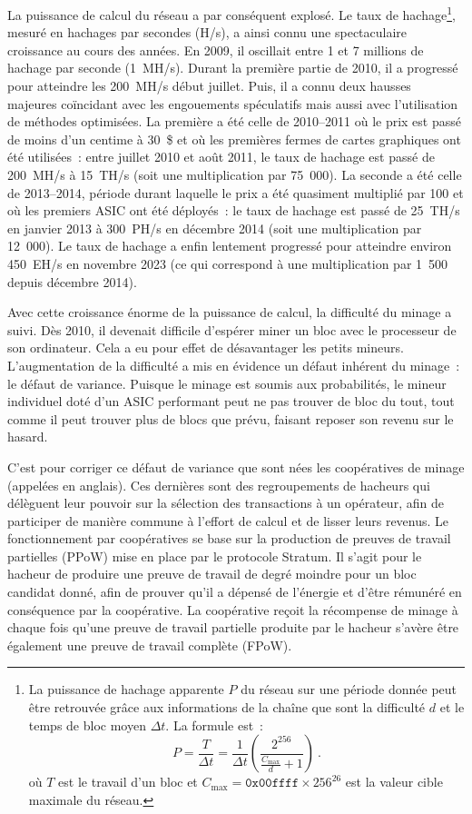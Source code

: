La puissance de calcul du réseau a par conséquent explosé. Le taux de hachage\footnote{La puissance de hachage apparente $P$ du réseau sur une période donnée peut être retrouvée grâce aux informations de la chaîne que sont la difficulté $d$ et le temps de bloc moyen $\Delta t$. La formule est~: \[
P = \frac{T}{\Delta t} = \frac{1}{\Delta t} \left( \frac{2^{256}}{\frac{C_{\mathrm{max}}}{d} + 1} \right)~.
\] où $T$ est le travail d'un bloc et $C_{\mathrm{max}} = \mathtt{0x00ffff} \times 256^{26}$ est la valeur cible maximale du réseau.}, mesuré en hachages par secondes (H/s), a ainsi connu une spectaculaire croissance au cours des années. En 2009, il oscillait entre 1 et 7 millions de hachage par seconde (1~MH/s). Durant la première partie de 2010, il a progressé pour atteindre les 200~MH/s début juillet. Puis, il a connu deux hausses majeures coïncidant avec les engouements spéculatifs mais aussi avec l'utilisation de méthodes optimisées. La première a été celle de 2010--2011 où le prix est passé de moins d'un centime à 30~\$ et où les premières fermes de cartes graphiques ont été utilisées~: entre juillet 2010 et août 2011, le taux de hachage est passé de 200~MH/s à 15~TH/s (soit une multiplication par 75~000). La seconde a été celle de 2013--2014, période durant laquelle le prix a été quasiment multiplié par 100 et où les premiers ASIC ont été déployés~: le taux de hachage est passé de 25~TH/s en janvier 2013 à 300~PH/s en décembre 2014 (soit une multiplication par 12~000). Le taux de hachage a enfin lentement progressé pour atteindre environ 450~EH/s en novembre 2023 (ce qui correspond à une multiplication par 1~500 depuis décembre 2014).


Avec cette croissance énorme de la puissance de calcul, la difficulté du minage a suivi. Dès 2010, il devenait difficile d'espérer miner un bloc avec le processeur de son ordinateur. Cela a eu pour effet de désavantager les petits mineurs. L'augmentation de la difficulté a mis en évidence un défaut inhérent du minage~: le défaut de variance. Puisque le minage est soumis aux probabilités, le mineur individuel doté d'un ASIC performant peut ne pas trouver de bloc du tout, tout comme il peut trouver plus de blocs que prévu, faisant reposer son revenu sur le hasard.

C'est pour corriger ce défaut de variance que sont nées les coopératives de minage (appelées  en anglais). Ces dernières sont des regroupements de hacheurs qui délèguent leur pouvoir sur la sélection des transactions à un opérateur, afin de participer de manière commune à l'effort de calcul et de lisser leurs revenus. Le fonctionnement par coopératives se base sur la production de preuves de travail partielles (PPoW) mise en place par le protocole Stratum. Il s'agit pour le hacheur de produire une preuve de travail de degré moindre pour un bloc candidat donné, afin de prouver qu'il a dépensé de l'énergie et d'être rémunéré en conséquence par la coopérative. La coopérative reçoit la récompense de minage à chaque fois qu'une preuve de travail partielle produite par le hacheur s'avère être également une preuve de travail complète (FPoW).

